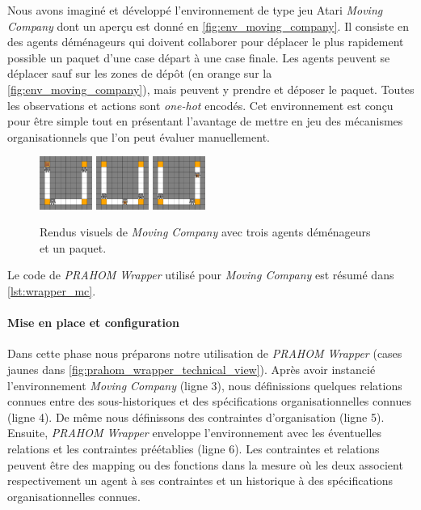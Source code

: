 \documentclass[demonstration]{jfsma}
\newcommand{\jp}[1]{\textbf{\color{red} JPJ: #1}}
\newcounter{relation}
\begin{document}
Nous avons imaginé et développé l'environnement de type jeu Atari \emph{Moving Company} dont un aperçu est donné en \autoref{fig:env_moving_company}.
Il consiste en des agents déménageurs qui doivent collaborer pour déplacer le plus rapidement possible un paquet d'une case départ à une case finale. Les agents peuvent se déplacer sauf sur les zones de dépôt (en orange sur la \autoref{fig:env_moving_company}), mais peuvent y prendre et déposer le paquet. Toutes les observations et actions sont \emph{one-hot} encodés. Cet environnement est conçu pour être simple tout en présentant l'avantage de mettre en jeu des mécanismes organisationnels que l'on peut évaluer manuellement.
%
\begin{figure}[h!]
  \centering
  \includegraphics[width=0.154\textwidth]{figures/moving_company_1.png}
  \includegraphics[width=0.154\textwidth]{figures/moving_company_2.png}
  \includegraphics[width=0.154\textwidth]{figures/moving_company_3.png}
  \caption{Rendus visuels de \emph{Moving Company} avec trois agents déménageurs et un paquet.}
  \label{fig:env_moving_company}
\end{figure}
%
Le code de \emph{PRAHOM Wrapper} utilisé pour \emph{Moving Company} est résumé dans \autoref{lst:wrapper_mc}.

\paragraph{Mise en place et configuration}

Dans cette phase nous préparons notre utilisation de \emph{PRAHOM Wrapper} (cases jaunes dans \autoref{fig:prahom_wrapper_technical_view}).
Après avoir instancié l'environnement \emph{Moving Company} (ligne 3), nous définissions quelques relations connues entre des sous-historiques et des spécifications organisationnelles connues (ligne 4). De même nous définissons des contraintes d'organisation (ligne 5). Ensuite, \emph{PRAHOM Wrapper} enveloppe l'environnement avec les éventuelles relations et les contraintes préétablies (ligne 6). Les contraintes et relations peuvent être des mapping ou des fonctions dans la mesure où les deux associent respectivement un agent à ses contraintes et un historique à des spécifications organisationnelles connues.
\end{document}
